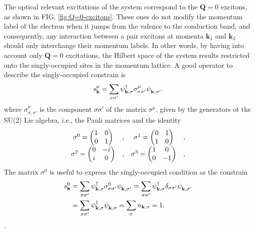 \documentclass[english,aps,prd,nofootinbib,twocolumn]{revtex4-1}
\begin{document}
The optical relevant excitations of the system correspond to the $\mathbf{Q}=0$ excitons, as shown in FIG. \ref{fig:Q=0-excitons}. These ones do not modify the momentum label of the electron when it jumps from the valence to the conduction band, and consequently, any interaction between a pair excitons at momenta $\mathbf{k}_{1}$ and $\mathbf{k}_{2}$ should only interchange their momentum labels. In other words, by having into account only $\mathbf{Q}=0$ excitations, the Hilbert space of the system results restricted onto the singly-occupied sites in the momentum lattice. A good operator to describe the singly-occupied constrain is
\begin{equation}
\label{eq:SU(2)-spin-operator}
s^{\mu}_{\mathbf{k }} = \sum_{\sigma \sigma'} 
\psi_{\mathbf{k ,\sigma }}^{\textcolor{black}{\dagger}}
\sigma^{\mu }_{\sigma \sigma'}
\psi_{\mathbf{k ,\sigma'}}^{\textcolor{white}{\dagger}}.
\end{equation}
where $\sigma^{\mu }_{\sigma  ,\sigma '}$ is the component $\sigma \sigma '$ of the matrix $\sigma^{\mu }$, given by the generators ot the SU(2) Lie algebra, i.e., the Pauli matrices and the identity
\begin{equation}
\begin{matrix}
\sigma^{0}_{\textcolor{white}{,}} = 
\begin{pmatrix}
1	&	0	\\	0	&	1
\end{pmatrix}	&	,	&	
\sigma^{1}_{\textcolor{white}{,}} = 
\begin{pmatrix}
0	&	1	\\	1	&	0
\end{pmatrix}	&	, \\
\sigma^{2}_{\textcolor{white}{,}} = 
\begin{pmatrix}
0	&	-i	\\	i	&	0
\end{pmatrix}	&	,	&	
\sigma^{3}_{\textcolor{white}{,}} = 
\begin{pmatrix}
1	&	0	\\	0	&	-1
\end{pmatrix}	&	,
\end{matrix}
\end{equation}
The matrix $\sigma^{0}$ is useful to express the singly-occupied condition as the constrain
\begin{equation}
\begin{split}
s^{0}_{\mathbf{k }} &= \sum_{\sigma \sigma'} 
\psi_{\mathbf{k ,\sigma }}^{\textcolor{black}{\dagger}}
\sigma^{0}_{\sigma \sigma'}
\psi_{\mathbf{k ,\sigma'}}^{\textcolor{white}{\dagger}} =
\sum_{\sigma \sigma'} 
\psi_{\mathbf{k ,\sigma }}^{\textcolor{black}{\dagger}}
\delta_{\sigma \sigma'}
\psi_{\mathbf{k ,\sigma'}}^{\textcolor{white}{\dagger}} \\ &=
\sum_{\sigma \sigma'} 
\psi_{\mathbf{k ,\sigma }}^{\textcolor{black}{\dagger}}
\psi_{\mathbf{k ,\sigma }}^{\textcolor{white}{\dagger}} =
\sum_{\sigma } 
n_{\mathbf{k ,\sigma }} = 
1.
\end{split}
\end{equation}.
\end{document}
